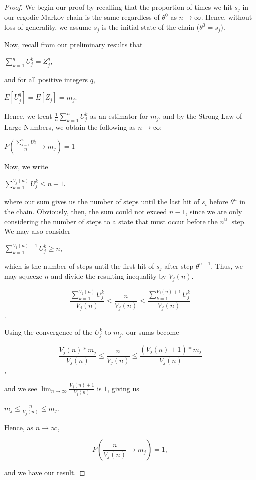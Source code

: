 \documentclass[12pt,twoside]{reedthesis}
\begin{document}
		\begin{proof}
		We begin our proof by recalling that the proportion of times we hit $s_j$ in our ergodic Markov chain is the same regardless of $\theta^0$ as $n \rightarrow \infty$. Hence, without loss of generality, we assume $s_j$ is the initial state of the chain ($\theta^0 = s_j$).
		
		Now, recall from our preliminary results that 
		\begin{center}
		 $\displaystyle\sum_{k=1}^{q}U_j^k 
		 = Z_j^q$,
		 \end{center}
		 and for all positive integers $q$, 
		 \begin{center}
			 $E[U_{j}^q] = E[Z_j] = m_j$.
		 \end{center}
		Hence, we treat $\frac{1}{n}\sum_{k=1}^{n}U_j^k$ as an estimator for $m_j$, 
		and by the Strong Law of Large Numbers, we obtain the following as $n \rightarrow \infty$: 
		\begin{center}
		$
		P\left(\displaystyle\frac{\sum_{k=1}^{n}U_j^k}{n} \rightarrow m_j \right) = 1
		$
		\end{center}
		Now, we write
		\begin{center}
		$\displaystyle\sum_{k=1}^{V_j(n)}U_j^k \leq n -1$, 
		\end{center}
		where our sum gives us the number of steps until the last hit of $s_i$ before $\theta^n$ in the chain.
		Obviously, then, the sum could not exceed $n -1$, since we are only considering the number of steps to a state that must occur before the $n^{\textrm{th}}$ step. We may also consider 
		\begin{center}
		$\displaystyle\sum_{k=1}^{V_j(n) + 1}U_j^k \geq n$,
		\end{center}
		which is the number of steps until the first hit of $s_j$ after step $\theta^{n-1}$. 
		Thus, we may squeeze $n$ and divide the resulting inequality by $V_j(n)$.
		\begin{center}
		$$\displaystyle\frac{\displaystyle\sum_{k=1}^{V_j(n)}U_j^k}{V_j(n)} \leq 
		\frac{n}{V_j(n)} \leq 
		\frac{\displaystyle\sum_{k=1}^{V_j(n) + 1}U_j^k}{V_j(n)}$$.
		\end{center}
		Using the convergence of the $U_j^k$ to $m_j$, our sums become
		\begin{center}
		$$\displaystyle\frac{V_j(n) * m_j}{V_j(n)} \leq 
		\frac{n}{V_j(n)} \leq 
		\frac{(V_j(n)+1) * m_j}{V_j(n)}$$,
		\end{center}		
		 and we see $\lim_{n \rightarrow \infty}\frac{V_j(n) +1 }{V_j(n)}$ is $1$, giving us
		 \begin{center}
		 	$ m_j \leq \displaystyle\frac{n}{V_j(n)} \leq m_j$.
		 \end{center}
		 Hence, as $n \rightarrow \infty$,
		 \begin{center}
		 $$
		 P\left( \displaystyle\frac{n}{V_j(n)} \longrightarrow {m_j} \right) = 1,
		 $$
		 \end{center}
		 and we have our result.
		 \end{proof}
\end{document}
